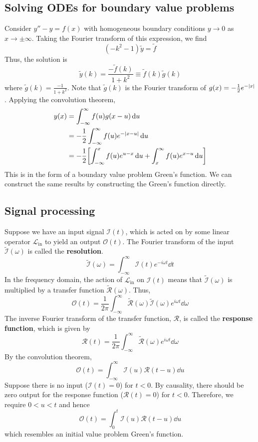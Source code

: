 \documentclass[a4paper]{article}
\begin{document}
\subsection{Solving ODEs for boundary value problems}
Consider \( y'' - y = f(x) \) with homogeneous boundary conditions \( y \to 0 \) as \( x \to \pm \infty \).
Taking the Fourier transform of this expression, we find
\[
	(-k^2 - 1) \widetilde y = \widetilde f
\]
Thus, the solution is
\[
	\widetilde y(k) = \frac{-\widetilde f(k)}{1+k^2} \equiv \widetilde f(k) \widetilde g(k)
\]
where \( \widetilde g(k) = \frac{-1}{1 + k^2} \).
Note that \( \widetilde g(k) \) is the Fourier transform of \( g(x) = -\frac{1}{2} e^{-\abs{x}} \).
Applying the convolution theorem,
\begin{align*}
	y(x) & = \int_{-\infty}^\infty f(u) g(x-u) \dd{u}                                                    \\
	     & = -\frac{1}{2} \int_{-\infty}^\infty f(u) e^{-\abs{x-u}}\dd{u}                                \\
	     & = -\frac{1}{2} \qty[ \int_{-\infty}^x f(u) e^{u-x}\dd{u} + \int_x^\infty f(u) e^{x-u}\dd{u} ]
\end{align*}
This is in the form of a boundary value problem Green's function.
We can construct the same results by constructing the Green's function directly.

\subsection{Signal processing}
Suppose we have an input signal \( \mathcal I(t) \), which is acted on by some linear operator \( \mathcal L_{\text{in}} \) to yield an output \( \mathcal O(t) \).
The Fourier transform of the input \( \widetilde{\mathcal I}(\omega) \) is called the \textbf{resolution}.
\[
	\widetilde{\mathcal I}(\omega) = \int_{-\infty}^\infty \mathcal I(t) e^{-i\omega t} \dd{t}
\]
In the frequency domain, the action of \( \mathcal L_{\text{in}} \) on \( \mathcal I(t) \) means that \( \widetilde{\mathcal I}(\omega) \) is multiplied by a transfer function \( \widetilde{\mathcal R}(\omega) \).
Thus,
\[
	\mathcal O(t) = \frac{1}{2\pi} \int_{-\infty}^\infty \widetilde{\mathcal R}(\omega) \widetilde{\mathcal I}(\omega) e^{i\omega t} \dd{\omega}
\]
The inverse Fourier transform of the transfer function, \( \mathcal R \), is called the \textbf{response function}, which is given by
\[
	\mathcal R(t) = \frac{1}{2\pi} \int_{-\infty}^\infty \widetilde{\mathcal R}(\omega) e^{i \omega t}\dd{\omega}
\]
By the convolution theorem,
\[
	\mathcal O(t) = \int_{-\infty}^\infty \mathcal I(u) \mathcal R(t-u) \dd{u}
\]
Suppose there is no input (\( \mathcal I(t) = 0 \)) for \( t < 0 \).
By causality, there should be zero output for the response function (\( \mathcal R(t) = 0 \)) for \( t < 0 \).
Therefore, we require \( 0 < u < t \) and hence
\[
	\mathcal O(t) = \int_0^t \mathcal I(u) \mathcal R(t-u) \dd{u}
\]
which resembles an initial value problem Green's function.
\end{document}
